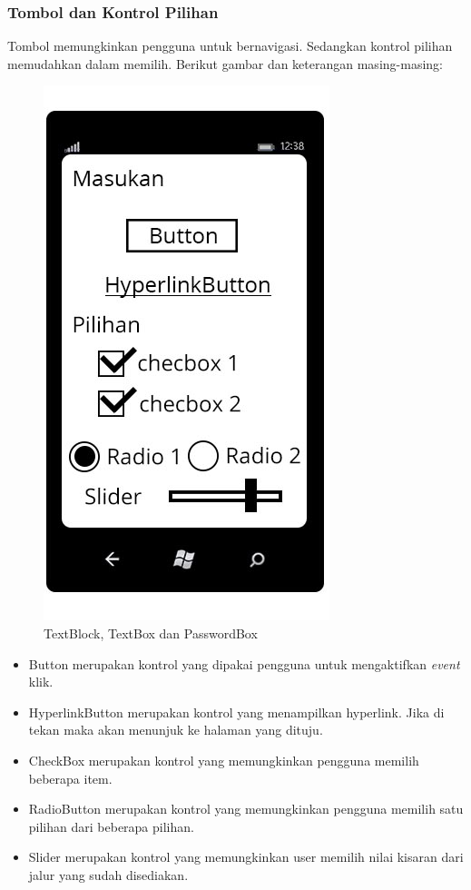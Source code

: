 \subsubsection{Tombol dan Kontrol Pilihan}
\label{subsubsec:Tombol dan Kontrol Pilihan}
\hspace{0.5cm} Tombol memungkinkan pengguna untuk bernavigasi. Sedangkan kontrol pilihan memudahkan dalam memilih. Berikut gambar dan keterangan masing-masing:
 
\begin{figure}[h]
	\centering
		\includegraphics[scale=0.5]{Gambar/Tombol/tombol_dan_pilihan}
	\caption{TextBlock, TextBox dan PasswordBox}
	\label{fig:kontrol_tombol}
\end{figure}

\begin{itemize}
	\item Button merupakan kontrol yang dipakai pengguna untuk mengaktifkan \textit{event} klik.
	\item HyperlinkButton merupakan kontrol yang menampilkan hyperlink. Jika di tekan maka akan menunjuk ke halaman yang dituju.	
	\item CheckBox merupakan kontrol yang memungkinkan pengguna memilih beberapa item.
	\item RadioButton merupakan kontrol yang memungkinkan pengguna memilih satu pilihan dari beberapa pilihan.
	\item Slider merupakan kontrol yang memungkinkan user memilih nilai kisaran dari jalur yang sudah disediakan.
\end{itemize}

